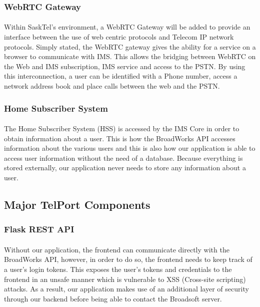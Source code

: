 \documentclass[12pt]{article}
\begin{document}
\subsubsection{WebRTC Gateway}
\paragraph{}
	Within SaskTel's environment, a WebRTC Gateway will be added to provide an interface between the use of web centric protocols and Telecom IP network protocols.  Simply stated, the WebRTC gateway gives the ability for a service on a browser to communicate with IMS.  This allows the bridging between WebRTC on the Web and IMS subscription, IMS service and access to the PSTN.  By using this interconnection, a user can be identified with a Phone number, access a network address book and place calls between the web and the PSTN.  

\subsubsection{Home Subscriber System}
\paragraph{}
	The Home Subscriber System (HSS) is accessed by the IMS Core in order to obtain information about a user. This is how the BroadWorks API accesses information about the various users and this is also how our application is able to access user information without the need of a database. Because everything is stored externally, our application never needs to store any information about a user.
	
\subsection{Major TelPort Components}
\subsubsection{Flask REST API}
\paragraph{}
	Without our application, the frontend can communicate directly with the BroadWorks API, however, in order to do so, the frontend needs to keep track of a user's login tokens. This exposes the user's tokens and credentials to the frontend in an unsafe manner which is vulnerable to XSS (Cross-site scripting) attacks. As a result, our application makes use of an additional layer of security through our backend before being able to contact the Broadsoft server.
	
\end{document}
